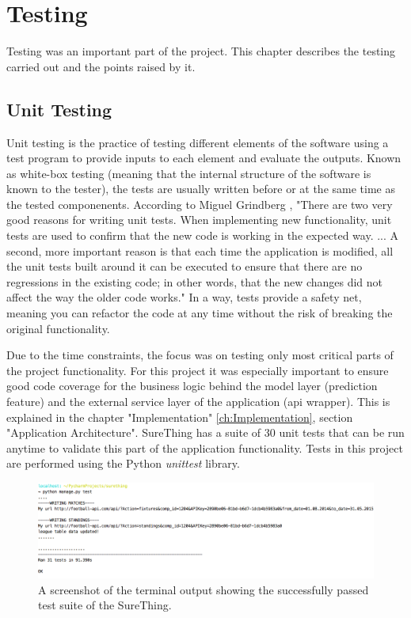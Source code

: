 \chapter{Testing}
\label{ch:Testing}
Testing was an important part of the project. This chapter describes the testing carried out and the points raised by it.

\section{Unit Testing}
\label{sec:unittesting_test}
Unit testing is the practice of testing different elements of the software using a test program to provide inputs to each element and evaluate the outputs.
Known as white-box testing (meaning that the internal structure of the software is known to the tester), the tests are usually written before or at the same time as the tested componenents. According to Miguel Grindberg \citep{book:Grindberg2014FlaskWebDevelopment}, "There are two very good reasons for writing unit tests. When implementing new functionality, unit tests are used to confirm that the new code is working in the expected way. ... A second, more important reason is that each time the application is modified, all the unit tests built around it can be executed to ensure that there are no regressions  in the existing code; in other words, that the new changes did not affect the way the older code works." In a way, tests provide a safety net, meaning you can refactor the code at any time without the risk of breaking the original functionality. 

Due to the time constraints, the focus was on testing only most critical parts of the project functionality. For this project it was especially important to ensure good code coverage for the business logic behind the model layer (prediction feature) and the external service layer of the application (api wrapper). This is explained in the chapter "Implementation" \ref{ch:Implementation}, section "Application Architecture". SureThing has a suite of 30 unit tests that can be run anytime to validate this part of the application functionality. Tests in this project are performed using the Python \emph{unittest} library. 

\begin{figure}[H]
	\begin{center}
		\includegraphics[width=.90\textwidth]{testing/images/unittestsOk}
		\caption{A screenshot of the terminal output showing the successfully passed test suite of the SureThing.} \label{fig:using:unitttestsok}
\end{center}
\end{figure}

